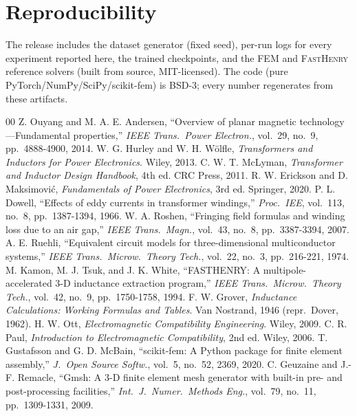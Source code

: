 \documentclass[letterpaper,twocolumn,9pt]{extarticle}
\begin{document}
\section*{Reproducibility}
The release includes the dataset generator (fixed seed), per-run logs for every
experiment reported here, the trained checkpoints, and the FEM and
\textsc{FastHenry} reference solvers (built from source, MIT-licensed). The code
(pure PyTorch/NumPy/SciPy/scikit-fem) is BSD-3; every number regenerates from
these artifacts.

{\scriptsize
\setlength{\itemsep}{-3pt}\setlength{\parskip}{-1pt}
\begin{thebibliography}{00}
 Z. Ouyang and M. A. E. Andersen, ``Overview of planar magnetic
technology---Fundamental properties,'' \emph{IEEE Trans.\ Power Electron.}, vol.\
29, no.\ 9, pp.\ 4888-4900, 2014.
 W. G. Hurley and W. H. W\"olfle, \emph{Transformers and Inductors
for Power Electronics}. Wiley, 2013.
 C. W. T. McLyman, \emph{Transformer and Inductor Design
Handbook}, 4th ed. CRC Press, 2011.
 R. W. Erickson and D. Maksimovi\'c, \emph{Fundamentals of Power
Electronics}, 3rd ed. Springer, 2020.
 P. L. Dowell, ``Effects of eddy currents in transformer
windings,'' \emph{Proc.\ IEE}, vol.\ 113, no.\ 8, pp.\ 1387-1394, 1966.
\bibitem{roshen} W. A. Roshen, ``Fringing field formulas and winding loss due to
an air gap,'' \emph{IEEE Trans.\ Magn.}, vol.\ 43, no.\ 8, pp.\ 3387-3394, 2007.
\bibitem{ruehli} A. E. Ruehli, ``Equivalent circuit models for three-dimensional
multiconductor systems,'' \emph{IEEE Trans.\ Microw.\ Theory Tech.}, vol.\ 22, no.\
3, pp.\ 216-221, 1974.
\bibitem{fasthenry} M. Kamon, M. J. Tsuk, and J. K. White, ``FASTHENRY: A
multipole-accelerated 3-D inductance extraction program,'' \emph{IEEE Trans.\
Microw.\ Theory Tech.}, vol.\ 42, no.\ 9, pp.\ 1750-1758, 1994.
\bibitem{grover} F. W. Grover, \emph{Inductance Calculations: Working Formulas and Tables}. Van Nostrand, 1946 (repr.\ Dover, 1962).
\bibitem{ott} H. W. Ott, \emph{Electromagnetic Compatibility Engineering}. Wiley,
2009.
\bibitem{paul} C. R. Paul, \emph{Introduction to Electromagnetic Compatibility},
2nd ed. Wiley, 2006.
 T. Gustafsson and G. D. McBain, ``scikit-fem: A Python package for
finite element assembly,'' \emph{J.\ Open Source Softw.}, vol.\ 5, no.\ 52, 2369,
2020.
\bibitem{gmsh} C. Geuzaine and J.-F. Remacle, ``Gmsh: A 3-D finite element mesh
generator with built-in pre- and post-processing facilities,'' \emph{Int.\ J.\
Numer.\ Methods Eng.}, vol.\ 79, no.\ 11, pp.\ 1309-1331, 2009.

\end{thebibliography}}
\end{document}
